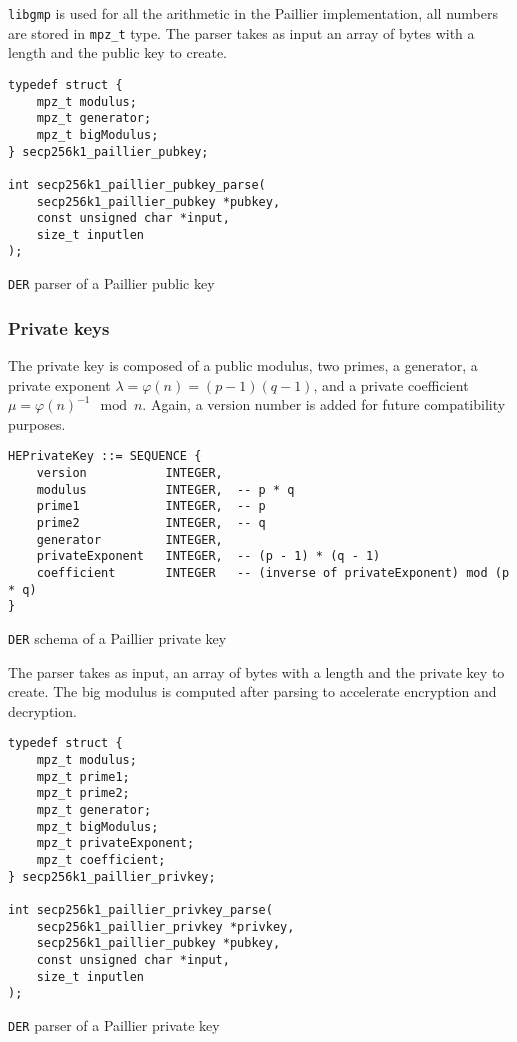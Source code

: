 \texttt{libgmp} is used for all the arithmetic in the Paillier implementation, all
numbers are stored in \texttt{mpz\_t} type. The parser takes as input an array
of bytes with a length and the public key to create.

\begin{listing}
  \begin{verbatim}
typedef struct {
    mpz_t modulus;
    mpz_t generator;
    mpz_t bigModulus;
} secp256k1_paillier_pubkey;

int secp256k1_paillier_pubkey_parse(
    secp256k1_paillier_pubkey *pubkey,
    const unsigned char *input,
    size_t inputlen
);
  \end{verbatim}
	\caption{\texttt{DER} parser of a Paillier public key}
	\label{lst:DERImplPaillierParsePub}
\end{listing}


\subsubsection{Private keys}

The private key is composed of a public modulus, two primes, a generator, a
private exponent $\lambda = \varphi(n) = (p-1)(q-1)$, and a private coefficient
$\mu = \varphi(n)^{-1} \mod n$. Again, a version number is added for future
compatibility purposes.

\begin{listing}
  \begin{verbatim}
HEPrivateKey ::= SEQUENCE {
    version           INTEGER,
    modulus           INTEGER,  -- p * q
    prime1            INTEGER,  -- p
    prime2            INTEGER,  -- q
    generator         INTEGER,
    privateExponent   INTEGER,  -- (p - 1) * (q - 1)
    coefficient       INTEGER   -- (inverse of privateExponent) mod (p * q)
}
  \end{verbatim}
	\caption{\texttt{DER} schema of a Paillier private key}
	\label{lst:DERSchemaPaillierPriv}
\end{listing}

The parser takes as input, an array of bytes with a length and the private key to
create. The big modulus is computed after parsing to accelerate encryption
and decryption.

\begin{listing}
  \begin{verbatim}
typedef struct {
    mpz_t modulus;
    mpz_t prime1;
    mpz_t prime2;
    mpz_t generator;
    mpz_t bigModulus;
    mpz_t privateExponent;
    mpz_t coefficient;
} secp256k1_paillier_privkey;

int secp256k1_paillier_privkey_parse(
    secp256k1_paillier_privkey *privkey,
    secp256k1_paillier_pubkey *pubkey,
    const unsigned char *input,
    size_t inputlen
);
  \end{verbatim}
	\caption{\texttt{DER} parser of a Paillier private key}
	\label{lst:DERImplPaillierParsePriv}
\end{listing}

